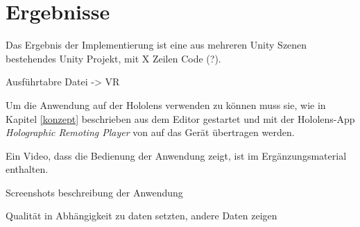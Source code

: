 

\chapter{Ergebnisse}
\label{ergebnisse}

Das Ergebnis der Implementierung ist eine aus mehreren Unity Szenen bestehendes Unity Projekt, mit X Zeilen Code (?). 

Ausführtabre Datei -> VR

Um die Anwendung auf der Hololens verwenden zu können muss sie, wie in Kapitel \ref{konzept} beschrieben aus dem Editor gestartet und mit der Hololens-App \textit{Holographic Remoting Player} von auf das Gerät übertragen werden. 



Ein Video, dass die Bedienung der Anwendung zeigt, ist im Ergänzungsmaterial enthalten.

Screenshots
beschreibung der Anwendung

Qualität in Abhängigkeit zu daten setzten, andere Daten zeigen
